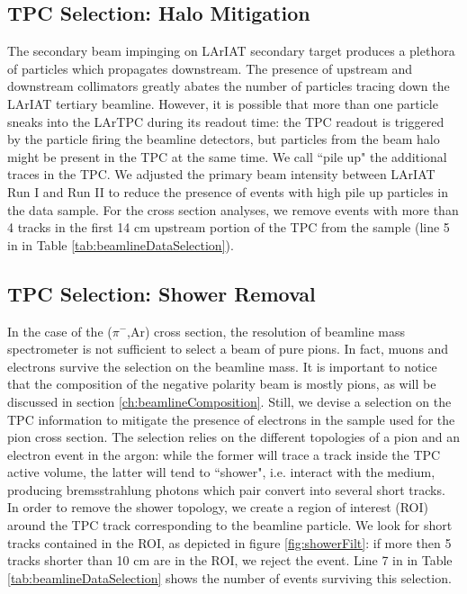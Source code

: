 \subsection{TPC Selection: Halo Mitigation }\label{ch:pileUp}
The secondary beam impinging on LArIAT secondary target produces a plethora of particles which propagates downstream. The presence of upstream and downstream collimators greatly abates the number of particles tracing down the LArIAT tertiary beamline. However, it is possible that more than one particle sneaks into the LArTPC during its readout time: the TPC readout is triggered by the particle  firing the beamline detectors, but particles from the beam halo might be present in the TPC at the same time. We call ``pile up" the additional traces in the TPC. We adjusted the primary beam intensity between LArIAT Run I and Run II to reduce the presence of events with high pile up particles in the data sample. For the cross section analyses, we remove events with more than 4 tracks in the first 14 cm upstream portion of the TPC from the sample (line 5 in in Table \ref{tab:beamlineDataSelection}).


\subsection{TPC Selection: Shower Removal}\label{ch:electrons}
In the case of the ($\pi^-$,Ar) cross section, the resolution of  beamline mass spectrometer is not sufficient to select a beam of pure pions. In fact, muons and electrons survive the selection on the beamline mass. It is important to notice that the composition of the negative polarity beam is mostly pions, as will be discussed in section \ref{ch:beamlineComposition}.
Still, we devise a selection on the TPC information to mitigate the presence of electrons in the sample used for the pion cross section. The selection relies on the different topologies of a pion and an electron event in the argon: while the former will trace a track inside the TPC active volume, the latter will tend to ``shower", i.e. interact with the medium, producing bremsstrahlung photons which pair convert into several short tracks. In order to remove the shower topology, we create a region of interest (ROI) around the TPC track corresponding to the beamline particle. We look for short tracks contained in the ROI, as depicted in figure \ref{fig:showerFilt}:  if more then 5 tracks shorter than 10 cm are in the ROI, we reject the event. Line 7 in in Table \ref{tab:beamlineDataSelection} shows the number of events surviving this selection.

